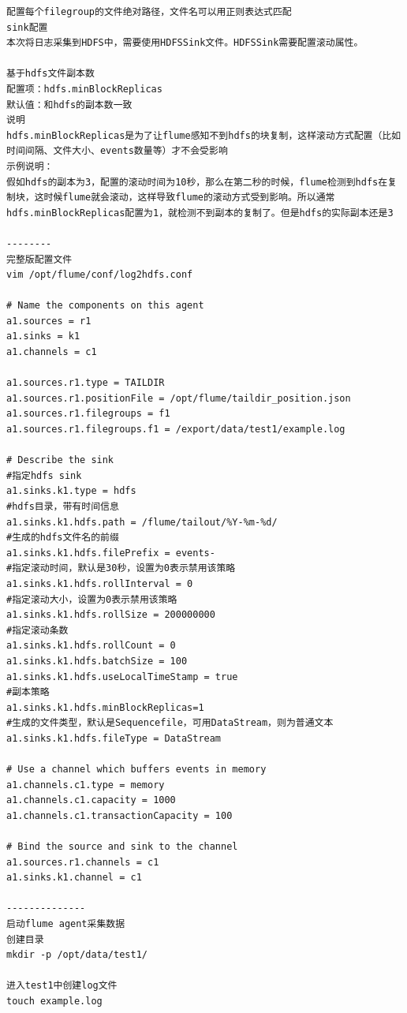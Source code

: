 \documentclass{article}
\begin{document}
\begin{enumerate}
\begin{lstlisting}
配置每个filegroup的文件绝对路径，文件名可以用正则表达式匹配
sink配置
本次将日志采集到HDFS中，需要使用HDFSSink文件。HDFSSink需要配置滚动属性。

基于hdfs文件副本数
配置项：hdfs.minBlockReplicas
默认值：和hdfs的副本数一致
说明
hdfs.minBlockReplicas是为了让flume感知不到hdfs的块复制，这样滚动方式配置（比如时间间隔、文件大小、events数量等）才不会受影响
示例说明：
假如hdfs的副本为3，配置的滚动时间为10秒，那么在第二秒的时候，flume检测到hdfs在复制块，这时候flume就会滚动，这样导致flume的滚动方式受到影响。所以通常hdfs.minBlockReplicas配置为1，就检测不到副本的复制了。但是hdfs的实际副本还是3

--------
完整版配置文件
vim /opt/flume/conf/log2hdfs.conf

# Name the components on this agent
a1.sources = r1
a1.sinks = k1
a1.channels = c1

a1.sources.r1.type = TAILDIR
a1.sources.r1.positionFile = /opt/flume/taildir_position.json
a1.sources.r1.filegroups = f1
a1.sources.r1.filegroups.f1 = /export/data/test1/example.log

# Describe the sink
#指定hdfs sink
a1.sinks.k1.type = hdfs
#hdfs目录，带有时间信息
a1.sinks.k1.hdfs.path = /flume/tailout/%Y-%m-%d/
#生成的hdfs文件名的前缀
a1.sinks.k1.hdfs.filePrefix = events-
#指定滚动时间，默认是30秒，设置为0表示禁用该策略
a1.sinks.k1.hdfs.rollInterval = 0
#指定滚动大小，设置为0表示禁用该策略
a1.sinks.k1.hdfs.rollSize = 200000000
#指定滚动条数
a1.sinks.k1.hdfs.rollCount = 0
a1.sinks.k1.hdfs.batchSize = 100
a1.sinks.k1.hdfs.useLocalTimeStamp = true
#副本策略
a1.sinks.k1.hdfs.minBlockReplicas=1
#生成的文件类型，默认是Sequencefile，可用DataStream，则为普通文本
a1.sinks.k1.hdfs.fileType = DataStream

# Use a channel which buffers events in memory
a1.channels.c1.type = memory
a1.channels.c1.capacity = 1000
a1.channels.c1.transactionCapacity = 100

# Bind the source and sink to the channel
a1.sources.r1.channels = c1
a1.sinks.k1.channel = c1

--------------
启动flume agent采集数据
创建目录
mkdir -p /opt/data/test1/

进入test1中创建log文件
touch example.log


\end{lstlisting}
\end{enumerate}
\end{document}
